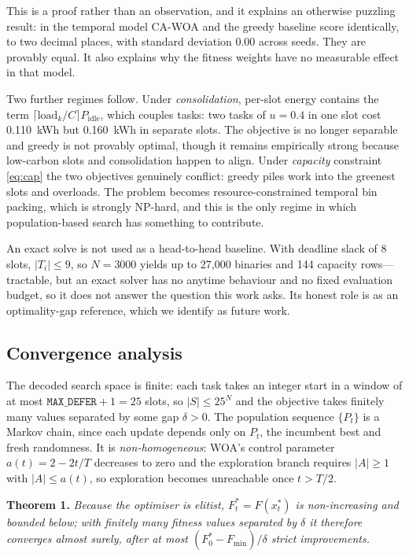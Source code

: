 \documentclass[12pt,a4paper]{article}
\begin{document}
\vspace{2pt}\noindent This is a proof rather than an observation, and it explains an otherwise puzzling
result: in the temporal model CA-WOA and the greedy baseline score identically, to two decimal places, with
standard deviation 0.00 across seeds. They are provably equal. It also explains why the fitness weights have
no measurable effect in that model.

Two further regimes follow. Under \emph{consolidation}, per-slot energy contains the term
$\lceil \text{load}_k/C\rceil P_{\text{idle}}$, which couples tasks: two tasks of $u=0.4$ in one slot cost
0.110~kWh but 0.160~kWh in separate slots. The objective is no longer separable and greedy is not provably
optimal, though it remains empirically strong because low-carbon slots and consolidation happen to align.
Under \emph{capacity} constraint \eqref{eq:cap} the two objectives genuinely conflict: greedy piles work into
the greenest slots and overloads. The problem becomes resource-constrained temporal bin packing, which is
strongly NP-hard, and this is the only regime in which population-based search has something to contribute.

An exact solve is not used as a head-to-head baseline. With deadline slack of 8 slots, $|T_i|\le 9$, so
$N=3000$ yields up to 27{,}000 binaries and 144 capacity rows---tractable, but an exact solver has no anytime
behaviour and no fixed evaluation budget, so it does not answer the question this work asks. Its honest role
is as an optimality-gap reference, which we identify as future work.

\subsection{Convergence analysis}\label{sec:conv}
The decoded search space is finite: each task takes an integer start in a window of at most
$\texttt{MAX\_DEFER}+1=25$ slots, so $|S|\le 25^{N}$ and the objective takes finitely many values separated by
some gap $\delta>0$. The population sequence $\{P_t\}$ is a Markov chain, since each update depends only on
$P_t$, the incumbent best and fresh randomness. It is \emph{non-homogeneous}: WOA's control parameter
$a(t)=2-2t/T$ decreases to zero and the exploration branch requires $|A|\ge 1$ with $|A|\le a(t)$, so
exploration becomes unreachable once $t>T/2$.

\vspace{2pt}\noindent\textbf{Theorem 1.} \emph{Because the optimiser is elitist, $F^{*}_t=F(x^{*}_t)$ is
non-increasing and bounded below; with finitely many fitness values separated by $\delta$ it therefore
converges almost surely, after at most $(F^{*}_0-F_{\min})/\delta$ strict improvements.}
\end{document}
